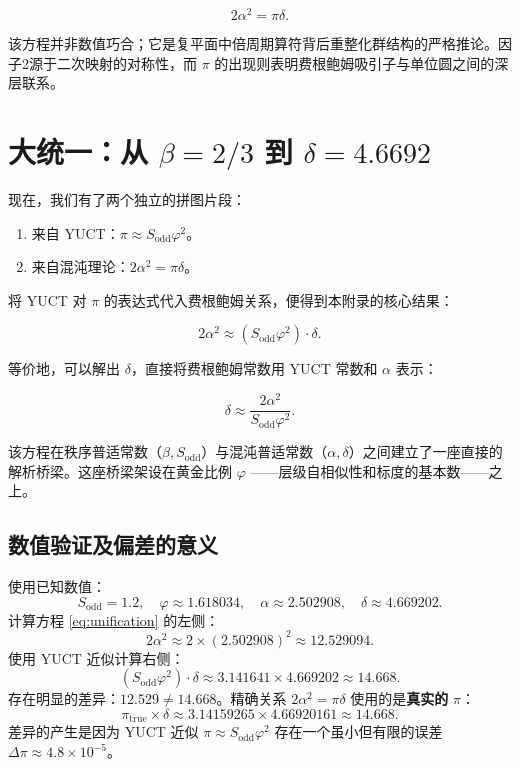 \documentclass[12pt,a4paper]{article}
\begin{document}
	\begin{equation}
		2\alpha^2 = \pi \delta.
		\label{eq:feigenbaum-pi}
	\end{equation}
	
	该方程并非数值巧合；它是复平面中倍周期算符背后重整化群结构的严格推论。因子2源于二次映射的对称性，而 \(\pi\) 的出现则表明费根鲍姆吸引子与单位圆之间的深层联系。
	
	\section{大统一：从 \(\beta = 2/3\) 到 \(\delta = 4.6692\)}
	
	现在，我们有了两个独立的拼图片段：
	\begin{enumerate}
		\item 来自 YUCT：\(\pi \approx S_{\mathrm{odd}}\varphi^2\)。
		\item 来自混沌理论：\(2\alpha^2 = \pi \delta\)。
	\end{enumerate}
	
	将 YUCT 对 \(\pi\) 的表达式代入费根鲍姆关系，便得到本附录的核心结果：
	
	\begin{equation}
		\boxed{2\alpha^2 \approx (S_{\mathrm{odd}}\varphi^2) \cdot \delta}.
		\label{eq:unification}
	\end{equation}
	
	等价地，可以解出 \(\delta\)，直接将费根鲍姆常数用 YUCT 常数和 \(\alpha\) 表示：
	
	\begin{equation}
		\delta \approx \frac{2\alpha^2}{S_{\mathrm{odd}}\varphi^2}.
	\end{equation}
	
	该方程在秩序普适常数（\(\beta, S_{\mathrm{odd}}\)）与混沌普适常数（\(\alpha, \delta\)）之间建立了一座直接的解析桥梁。这座桥梁架设在黄金比例 \(\varphi\) ——层级自相似性和标度的基本数——之上。
	
	\subsection{数值验证及偏差的意义}
	
	使用已知数值：
	\[
	S_{\mathrm{odd}} = 1.2, \quad \varphi \approx 1.618034, \quad \alpha \approx 2.502908, \quad \delta \approx 4.669202.
	\]
	计算方程 \eqref{eq:unification} 的左侧：
	\[
	2\alpha^2 \approx 2 \times (2.502908)^2 \approx 12.529094.
	\]
	使用 YUCT 近似计算右侧：
	\[
	(S_{\mathrm{odd}}\varphi^2) \cdot \delta \approx 3.141641 \times 4.669202 \approx 14.668.
	\]
	存在明显的差异：\(12.529 \neq 14.668\)。精确关系 \(2\alpha^2 = \pi \delta\) 使用的是\textbf{真实的} \(\pi\)：
	\[
	\pi_{\mathrm{true}} \times \delta \approx 3.14159265 \times 4.66920161 \approx 14.668.
	\]
	差异的产生是因为 YUCT 近似 \(\pi \approx S_{\mathrm{odd}}\varphi^2\) 存在一个虽小但有限的误差 \(\Delta\pi \approx 4.8\times10^{-5}\)。
	
\end{document}
